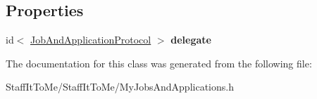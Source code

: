 \subsection*{\-Properties}
\begin{DoxyCompactItemize}
\item 
\hypertarget{interface_my_jobs_and_applications_ab9300b920eb893e157e4083621d7765a}{
id$<$ \hyperlink{protocol_job_and_application_protocol-p}{\-Job\-And\-Application\-Protocol} $>$ {\bfseries delegate}}
\label{interface_my_jobs_and_applications_ab9300b920eb893e157e4083621d7765a}

\end{DoxyCompactItemize}


\-The documentation for this class was generated from the following file\-:\begin{DoxyCompactItemize}
\item 
\-Staff\-It\-To\-Me/\-Staff\-It\-To\-Me/\-My\-Jobs\-And\-Applications.\-h\end{DoxyCompactItemize}
